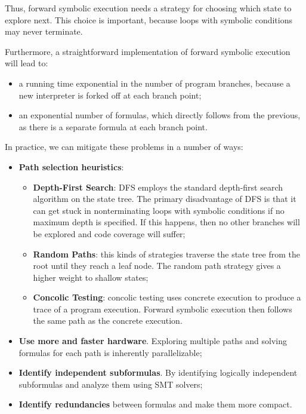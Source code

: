 Thus, forward symbolic execution needs a strategy for choosing which state to explore next. This choice is important, because loops with symbolic conditions may never terminate. 

Furthermore, a straightforward implementation of forward symbolic execution will lead to:
\begin{itemize}
	\item a running time exponential in the number of program branches, because a new interpreter is forked off at each branch point;
	\item an exponential number of formulas, which directly follows from the previous, as there is a separate formula at each branch point.
\end{itemize}
In practice, we can mitigate these problems in a number of ways:
\begin{itemize}
	\item \textbf{Path selection heuristics}:
	\begin{itemize}
		\item \textbf{Depth-First Search}: DFS employs the standard depth-first search algorithm on the state tree. The primary disadvantage of DFS is that it can get stuck in nonterminating loops with symbolic conditions if no maximum depth is specified. If this happens, then no other branches will be explored and code coverage will suffer;
		\item \textbf{Random Paths}: this kinds of strategies traverse the state tree from the root until they reach a leaf node. The random path strategy gives a higher weight to shallow states;
		\item \textbf{Concolic Testing}: concolic testing uses concrete execution to produce a trace of a program execution. Forward symbolic execution then follows the same path as the concrete execution.
	\end{itemize}
	\item \textbf{Use more and faster hardware}. Exploring multiple paths and solving formulas for each path is inherently parallelizable;
	\item \textbf{Identify independent subformulas}. By identifying logically independent subformulas and analyze them using SMT solvers;
	\item \textbf{Identify redundancies} between formulas and make them more compact.
\end{itemize}